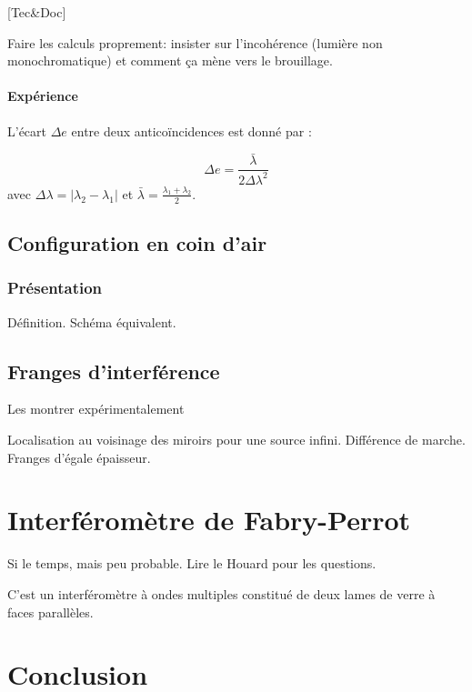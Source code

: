 \documentclass[11pt]{report}
\numberwithin{figure}{section}
\numberwithin{equation}{section}
\numberwithin{table}{section}
\newcommand{\1}{\boldsymbol{1}}
\begin{document}
[Tec\&Doc]

Faire les calculs proprement: insister sur l'incohérence (lumière non monochromatique) et comment ça mène vers le brouillage.

\paragraph{Expérience}  L'écart $\Delta e$ entre deux anticoïncidences est donné par :

\begin{equation}
      \Delta e = \frac{\bar{{\lambda}}}{2\Delta\lambda^2}
\end{equation}
avec $\Delta\lambda =|\lambda_2-\lambda_1|$ et $\bar{{\lambda}}=\frac{\lambda_1+\lambda_2}{2}$.

\subsection{Configuration en coin d'air}

\subsubsection{Présentation}

Définition. Schéma équivalent.

\subsection{Franges d'interférence}

\textcolor{mycolor5}{Les montrer expérimentalement}

Localisation au voisinage des miroirs pour une source infini. Différence de marche. Franges d'égale épaisseur.

\section{Interféromètre de Fabry-Perrot}

Si le temps, mais peu probable. Lire le Houard pour les questions. 

C'est un interféromètre à ondes multiples constitué de deux lames de verre à faces parallèles.

\section*{Conclusion}
\end{document}
